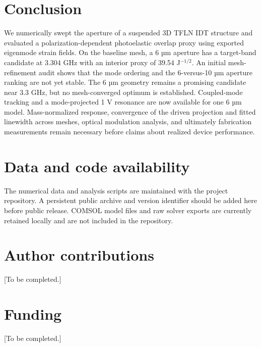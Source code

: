 \documentclass[10pt,twocolumn]{article}
\begin{document}
\section{Conclusion}
We numerically swept the aperture of a suspended 3D TFLN IDT structure and evaluated a polarization-dependent photoelastic overlap proxy using exported eigenmode strain fields. On the baseline mesh, a 6 µm aperture has a target-band candidate at 3.304 GHz with an interior proxy of 39.54 J$^{-1/2}$. An initial mesh-refinement audit shows that the mode ordering and the 6-versus-10 µm aperture ranking are not yet stable. The 6 µm geometry remains a promising candidate near 3.3 GHz, but no mesh-converged optimum is established. Coupled-mode tracking and a mode-projected 1 V resonance are now available for one 6 µm model. Mass-normalized response, convergence of the driven projection and fitted linewidth across meshes, optical modulation analysis, and ultimately fabrication measurements remain necessary before claims about realized device performance.
\section*{Data and code availability}
The numerical data and analysis scripts are maintained with the project repository. A persistent public archive and version identifier should be added here before public release. COMSOL model files and raw solver exports are currently retained locally and are not included in the repository.
\section*{Author contributions} [To be completed.]
\section*{Funding} [To be completed.]
\end{document}
